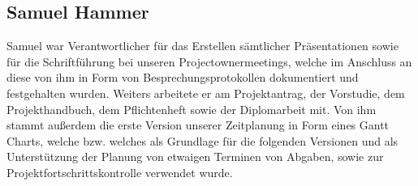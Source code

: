 \subsection{Samuel Hammer}
Samuel war Verantwortlicher für das Erstellen sämtlicher Präsentationen sowie für die Schriftführung bei unseren Projectownermeetings, welche im Anschluss an diese von ihm in Form von Besprechungsprotokollen dokumentiert und festgehalten wurden. Weiters arbeitete er am Projektantrag, der Vorstudie, dem Projekthandbuch, dem Pflichtenheft sowie der Diplomarbeit mit. Von ihm stammt außerdem die erste Version unserer Zeitplanung in Form eines Gantt Charts, welche bzw. welches als Grundlage für die folgenden Versionen und als Unterstützung der Planung von etwaigen Terminen von Abgaben, sowie zur Projektfortschrittskontrolle verwendet wurde.


